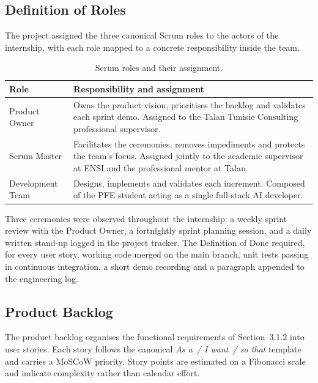 \subsection{Definition of Roles}

The project assigned the three canonical Scrum roles to the actors
of the internship, with each role mapped to a concrete responsibility
inside the team.

\begin{table}[!htbp]
    \centering
    {\renewcommand{\arraystretch}{1.1}%
    \begin{tabular}{|l|p{10.5cm}|}
        \hline
        \textbf{Role} & \textbf{Responsibility and assignment} \\
        \hline
        Product Owner & Owns the product vision, prioritises the backlog
        and validates each sprint demo. Assigned to the Talan Tunisie
        Consulting professional supervisor. \\
        \hline
        Scrum Master & Facilitates the ceremonies, removes impediments
        and protects the team's focus. Assigned jointly to the academic
        supervisor at \acs{ENSI} and the professional mentor at Talan. \\
        \hline
        Development Team & Designs, implements and validates each
        increment. Composed of the \acs{PFE} student acting as a
        single full-stack \acs{AI} developer. \\
        \hline
    \end{tabular}}
    \caption{Scrum roles and their assignment.}
    \label{tab:scrum-roles}
\end{table}

Three ceremonies were observed throughout the internship: a weekly
sprint review with the Product Owner, a fortnightly sprint planning
session, and a daily written stand-up logged in the project tracker.
The Definition of Done required, for every user story, working code
merged on the main branch, unit tests passing in continuous
integration, a short demo recording and a paragraph appended to the
engineering log.

\subsection{Product Backlog}

The product backlog organises the functional requirements of
Section~3.1.2 into user stories. Each story follows the canonical
\textit{As a~/ I want~/ so that} template and carries a \acs{MoSCoW}
priority. Story points are estimated on a Fibonacci scale and
indicate complexity rather than calendar effort.

